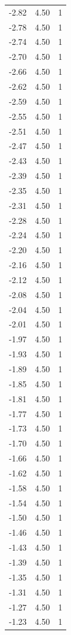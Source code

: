 \begin{longtable}{lrr}
  -2.82 & 4.50 & 1 \\
  -2.78 & 4.50 & 1 \\
  -2.74 & 4.50 & 1 \\
  -2.70 & 4.50 & 1 \\
  -2.66 & 4.50 & 1 \\
  -2.62 & 4.50 & 1 \\
  -2.59 & 4.50 & 1 \\
  -2.55 & 4.50 & 1 \\
  -2.51 & 4.50 & 1 \\
  -2.47 & 4.50 & 1 \\
  -2.43 & 4.50 & 1 \\
  -2.39 & 4.50 & 1 \\
  -2.35 & 4.50 & 1 \\
  -2.31 & 4.50 & 1 \\
  -2.28 & 4.50 & 1 \\
  -2.24 & 4.50 & 1 \\
  -2.20 & 4.50 & 1 \\
  -2.16 & 4.50 & 1 \\
  -2.12 & 4.50 & 1 \\
  -2.08 & 4.50 & 1 \\
  -2.04 & 4.50 & 1 \\
  -2.01 & 4.50 & 1 \\
  -1.97 & 4.50 & 1 \\
  -1.93 & 4.50 & 1 \\
  -1.89 & 4.50 & 1 \\
  -1.85 & 4.50 & 1 \\
  -1.81 & 4.50 & 1 \\
  -1.77 & 4.50 & 1 \\
  -1.73 & 4.50 & 1 \\
  -1.70 & 4.50 & 1 \\
  -1.66 & 4.50 & 1 \\
  -1.62 & 4.50 & 1 \\
  -1.58 & 4.50 & 1 \\
  -1.54 & 4.50 & 1 \\
  -1.50 & 4.50 & 1 \\
  -1.46 & 4.50 & 1 \\
  -1.43 & 4.50 & 1 \\
  -1.39 & 4.50 & 1 \\
  -1.35 & 4.50 & 1 \\
  -1.31 & 4.50 & 1 \\
  -1.27 & 4.50 & 1 \\
  -1.23 & 4.50 & 1 \\

\end{longtable}
